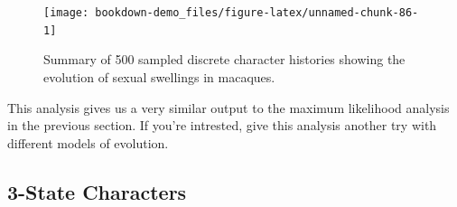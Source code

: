 \documentclass[
]{book}
\newenvironment{Shaded}{\begin{snugshade}}{\end{snugshade}}
\newcommand{\DataTypeTok}[1]{\textcolor[rgb]{0.13,0.29,0.53}{#1}}
\newcommand{\DecValTok}[1]{\textcolor[rgb]{0.00,0.00,0.81}{#1}}
\newcommand{\FloatTok}[1]{\textcolor[rgb]{0.00,0.00,0.81}{#1}}
\newcommand{\KeywordTok}[1]{\textcolor[rgb]{0.13,0.29,0.53}{\textbf{#1}}}
\newcommand{\NormalTok}[1]{#1}
\newcommand{\OperatorTok}[1]{\textcolor[rgb]{0.81,0.36,0.00}{\textbf{#1}}}
\newcommand{\StringTok}[1]{\textcolor[rgb]{0.31,0.60,0.02}{#1}}
\begin{document}
\begin{Shaded}
\end{Shaded}

\begin{figure}[H]

{\centering \texttt{[image: bookdown-demo\_files/figure-latex/unnamed-chunk-86-1]} 

}

\caption{Summary of 500 sampled discrete character histories showing the evolution of sexual swellings in macaques.}\label{fig:unnamed-chunk-86}
\end{figure}

This analysis gives us a very similar output to the maximum likelihood analysis in the previous section. If you're intrested, give this analysis another try with different models of evolution.

\hypertarget{state-characters-1}{%
\subsection{3-State Characters}\label{state-characters-1}}
\end{document}
